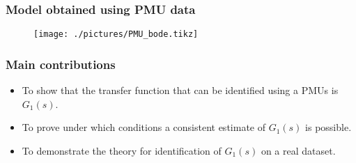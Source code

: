\begin{frame}
	\frametitle{Model obtained using PMU data}
	\begin{figure}
		\texttt{[image: ./pictures/PMU\_bode.tikz]}
	\end{figure}
\end{frame}
\begin{frame}
	\frametitle{Main contributions}
	\begin{itemize}
		\item To show that the transfer function that can be identified using a PMUs is $G_1(s)$.
		\item To prove under which conditions a consistent estimate of $G_1(s)$ is possible.
		\item To demonstrate the theory for identification of $G_1(s)$ on a real dataset.
	\end{itemize}
\end{frame}
